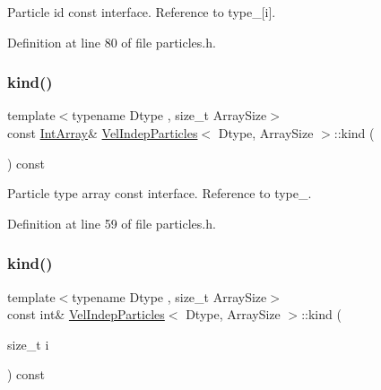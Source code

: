 Particle id const interface. Reference to type\+\_\+\mbox{[}i\mbox{]}. 



Definition at line 80 of file particles.\+h.

\mbox{\label{class_vel_indep_particles_a81ca7cfb6c53e5d29c3afc24ff25877d}} 
\subsubsection{\texorpdfstring{kind()}{kind()}\hspace{0.1cm}{\footnotesize\ttfamily [1/2]}}
{\footnotesize\ttfamily template$<$typename Dtype , size\+\_\+t Array\+Size$>$ \\
const \mbox{\hyperlink{class_vel_indep_particles_a5e4f20d435c71a5f4179143206258a81}{Int\+Array}}\& \mbox{\hyperlink{class_vel_indep_particles}{Vel\+Indep\+Particles}}$<$ Dtype, Array\+Size $>$\+::kind (\begin{DoxyParamCaption}{ }\end{DoxyParamCaption}) const\hspace{0.3cm}{\ttfamily [inline]}}



Particle type array const interface. Reference to type\+\_\+. 



Definition at line 59 of file particles.\+h.

\mbox{\label{class_vel_indep_particles_abc89cea5ae508c4edaf4d7a62256e355}} 
\subsubsection{\texorpdfstring{kind()}{kind()}\hspace{0.1cm}{\footnotesize\ttfamily [2/2]}}
{\footnotesize\ttfamily template$<$typename Dtype , size\+\_\+t Array\+Size$>$ \\
const int\& \mbox{\hyperlink{class_vel_indep_particles}{Vel\+Indep\+Particles}}$<$ Dtype, Array\+Size $>$\+::kind (\begin{DoxyParamCaption}\item[{size\+\_\+t}]{i }\end{DoxyParamCaption}) const\hspace{0.3cm}{\ttfamily [inline]}}



